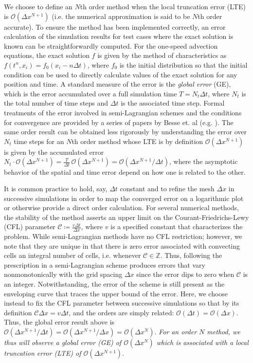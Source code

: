 \documentclass[11pt,titlepage]{report}
\begin{document}
\indent\indent We choose to define an $N$th order method when the local truncation error (LTE) is $\mathcal{O}(\Delta x^{N+1})$ (i.e. the numerical approximation is said to be $N$th order accurate). To ensure the method has been implemented correctly, an error calculation of the simulation results for test cases where the exact solution is known can be straightforwardly computed. For the one-speed advection equations, the exact solution $f$ is given by the method of characteristics as $f(t^n,x_i) = f_0(x_i - n\Delta t)$, where $f_0$ is the initial distribution so that the initial condition can be used to directly calculate values of the exact solution for any position and time. A standard measure of the error is the \emph{global error} (GE), which is the error accumulated over a full simulation time $T = N_t \Delta t$, where $N_t$ is the total number of time steps and $\Delta t$ is the associated time step. Formal treatments of the error involved in semi-Lagrangian schemes and the conditions for convergence are provided by a series of papers by Besse et. al (e.g. \cite{Besse08}). The same order result can be obtained less rigorously by understanding the error over $N_t$ time steps for an $N$th order method whose LTE is by definition $\mathcal{O}(\Delta x^{N+1})$ is given by the accumulated error $N_t\cdot \mathcal{O}(\Delta x^{N+1}) = \tfrac{T}{\Delta t}\,\mathcal{O}(\Delta x^{N+1}) = \mathcal{O}(\Delta x^{N+1} / \Delta t)$, where the asymptotic behavior of the spatial and time error depend on how one is related to the other. 

It is common practice to hold, say, $\Delta t$ constant and to refine the mesh $\Delta x$ in successive simulations in order to map the converged error on a logarithmic plot or otherwise provide a direct order calculation. For several numerical methods, the stability of the method asserts an upper limit on the Courant-Friedrichs-Lewy (CFL) parameter $\mathcal{C} \coloneqq \tfrac{v\Delta t}{\Delta x}$, where $v$ is a specified constant that characterizes the problem. While semi-Lagrangian methods have no CFL restriction; however, we note that they are unique in that there is zero error associated with convecting cells an integral number of cells, i.e. whenever $\mathcal{C}\in\mathbb{Z}$.  Thus, following the prescription in a semi-Lagrangian scheme produces errors that vary nonmonotonically with the grid spacing $\Delta x$ since the error dips to zero when $\mathcal{C}$ is an integer. Notwithstanding, the error of the scheme is still present as the enveloping curve that traces the upper bound of the error. Here, we choose instead to fix the CFL parameter between successive simulations so that by its definition $\mathcal{C}\Delta x = v\Delta t$, and the orders are simply related: $\mathcal{O}(\Delta t) = \mathcal{O}(\Delta x)$. Thus, the global error result above is $\mathcal{O}(\Delta x^{N+1} / \Delta t) = \mathcal{O}(\Delta x^{N+1} / \Delta x) = \mathcal{O}(\Delta x^N)$. \emph{For an order $N$ method, we thus will observe a global error (GE) of $\mathcal{O}(\Delta x^N)$ which is associated with a local truncation error (LTE) of $\mathcal{O}(\Delta x^{N+1})$}. 
\end{document}
